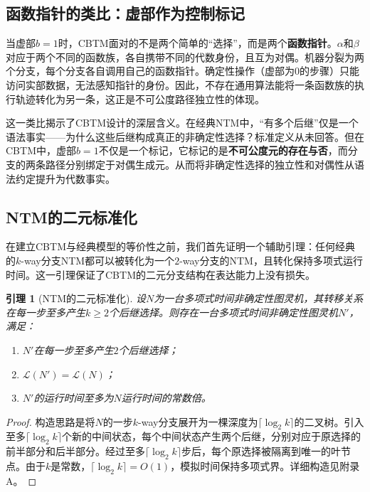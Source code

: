 \documentclass{ctexart}
\newtheorem{lemma}[theorem]{引理}
\newtheorem{proof}[theorem]{证明}
\begin{document}
	\subsection{函数指针的类比：虚部作为控制标记}
	
	当虚部$b=1$时，CBTM面对的不是两个简单的``选择''，而是两个\textbf{函数指针}。$\alpha$和$\beta$对应于两个不同的函数族，各自携带不同的代数身份，且互为对偶。机器分裂为两个分支，每个分支各自调用自己的函数指针。确定性操作（虚部为0的步骤）只能访问实部数据，无法感知指针的身份。因此，不存在通用算法能将一条函数族的执行轨迹转化为另一条，这正是不可公度路径独立性的体现。
	
	这一类比揭示了CBTM设计的深层含义。在经典NTM中，``有多个后继''仅是一个语法事实——为什么这些后继构成真正的非确定性选择？标准定义从未回答。但在CBTM中，虚部$b=1$不仅是一个标记，它标记的是\textbf{不可公度元的存在与否}，而分支的两条路径分别绑定于对偶生成元。从而将非确定性选择的独立性和对偶性从语法约定提升为代数事实。
	
	\subsection{NTM的二元标准化}
	
	在建立CBTM与经典模型的等价性之前，我们首先证明一个辅助引理：任何经典的$k$-way分支NTM都可以被转化为一个$2$-way分支的NTM，且转化保持多项式运行时间。这一引理保证了CBTM的二元分支结构在表达能力上没有损失。
	
	\begin{lemma}[NTM的二元标准化]\label{lem:binary-ntm}
		设$N$为一台多项式时间非确定性图灵机，其转移关系在每一步至多产生$k \ge 2$个后继选择。则存在一台多项式时间非确定性图灵机$N'$，满足：
		\begin{enumerate}
			\item $N'$在每一步至多产生$2$个后继选择；
			\item $\mathcal{L}(N') = \mathcal{L}(N)$；
			\item $N'$的运行时间至多为$N$运行时间的常数倍。
		\end{enumerate}
	\end{lemma}
	\begin{proof}
		构造思路是将$N$的一步$k$-way分支展开为一棵深度为$\lceil \log_2 k \rceil$的二叉树。引入至多$\lceil \log_2 k \rceil$个新的中间状态，每个中间状态产生两个后继，分别对应于原选择的前半部分和后半部分。经过至多$\lceil \log_2 k \rceil$步后，每个原选择被隔离到唯一的叶节点。由于$k$是常数，$\lceil \log_2 k \rceil = O(1)$，模拟时间保持多项式界。详细构造见附录A。
	\end{proof}
	
\end{document}
